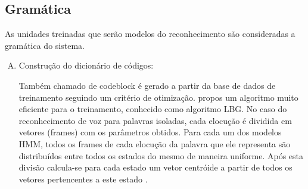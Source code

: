 \subsection{Gramática}
As unidades treinadas que serão modelos do reconhecimento são consideradas a gramática do sistema.

\begin{enumerate}[A)]
\item Construção do dicionário de códigos:

Também chamado de codeblock  é gerado a partir da base de dados de treinamento seguindo um critério de otimização.  propos um algoritmo muito eficiente para o treinamento, conhecido como algoritmo LBG. No caso do reconhecimento de voz para palavras isoladas, cada elocução é dividida em vetores (frames) com os parâmetros obtidos. Para cada um dos modelos HMM, todos os frames de cada elocução da palavra que ele
representa são distribuídos entre todos os estados do mesmo de maneira uniforme. Após esta divisão calcula-se para cada estado um vetor centróide a partir de todos os vetores pertencentes a este estado \cite{RavIsolAnderson}.
\end{enumerate}
